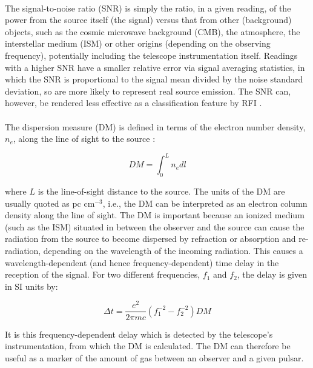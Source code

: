 \documentclass[12pt]{article}
\begin{document}
\paragraph{}
The signal-to-noise ratio (SNR) is simply the ratio, in a given reading, of the power from the source itself (the signal) versus that from other (background) objects, such as the cosmic microwave background (CMB), the atmosphere, the interstellar medium (ISM) or other origins (depending on the observing frequency), potentially including the telescope instrumentation itself. Readings with a higher SNR have a smaller relative error via signal averaging statistics, in which the SNR is proportional to the signal mean divided by the noise standard deviation, so are more likely to represent real source emission. The SNR can, however, be rendered less effective as a classification feature by RFI \cite{zhu2014searching}.
\paragraph{}
The dispersion measure (DM) is defined in terms of the electron number density, $n_{e}$, along the line of sight to the source \cite{ahuja2005tracking}:

\begin{equation}
DM = \int_{0}^{L}n_{e}dl
\label{dm}
\end{equation}

where $L$ is the line-of-sight distance to the source. The units of the DM are usually quoted as pc cm$^{-3}$, i.e., the DM can be interpreted as an electron column density along the line of sight. The DM is important because an ionized medium (such as the ISM) situated in between the observer and the source can cause the radiation from the source to become dispersed by refraction or absorption and re-radiation, depending on the wavelength of the incoming radiation. This causes a wavelength-dependent (and hence frequency-dependent) time delay in the reception of the signal. For two different frequencies, $f_{1}$ and $f_{2}$, the delay is given in SI units by:

\begin{equation}
\Delta t= \frac{e^2}{2\pi mc}(f_{1}^{-2} - f_{2}^{-2}) DM
\label{deltat}
\end{equation}

It is this frequency-dependent delay which is detected by the telescope's instrumentation, from which the DM is calculated. The DM can therefore be useful as a marker of the amount of gas between an observer and a given pulsar.
\end{document}
